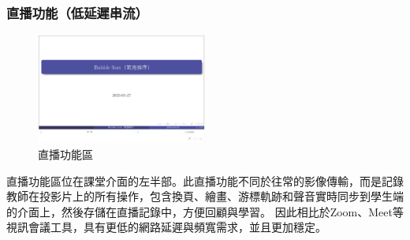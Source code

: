 
\subsubsection{直播功能（低延遲串流）}

\begin{figure}[H]
  \centering
  \includegraphics[width=0.5\textwidth]{images/streaming.png}
  \caption{直播功能區}
\end{figure}

直播功能區位在課堂介面的左半部。此直播功能不同於往常的影像傳輸，而是記錄教師在投影片上的所有操作，包含換頁、繪畫、游標軌跡和聲音實時同步到學生端的介面上，然後存儲在直播記錄中，方便回顧與學習。
因此相比於Zoom、Meet等視訊會議工具，具有更低的網路延遲與頻寬需求，並且更加穩定。







